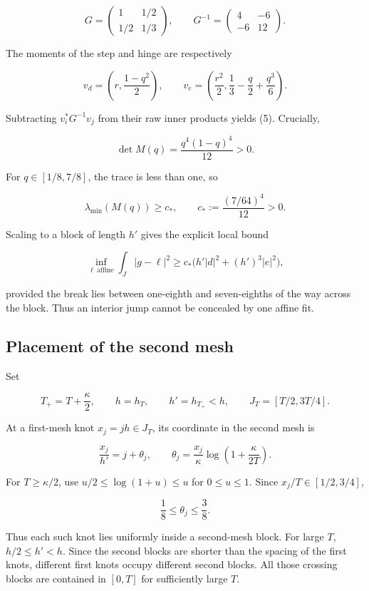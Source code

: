\documentclass[
  11pt,
]{article}
\begin{document}
\[
G=\begin{pmatrix}1&1/2\\1/2&1/3\end{pmatrix},
\qquad G^{-1}=\begin{pmatrix}4&-6\\-6&12\end{pmatrix}.
\]

The moments of the step and hinge are respectively

\[
v_d=\left(r,\frac{1-q^2}{2}\right),
\qquad
v_e=\left(\frac{r^2}{2},\frac13-\frac q2+\frac{q^3}{6}\right).
\]

Subtracting \(v_i^*G^{-1}v_j\) from their raw inner products yields (5).
Crucially,

\[
\det M(q)=\frac{q^4(1-q)^4}{12}>0. \tag{6}
\]

For \(q\in[1/8,7/8]\), the trace is less than one, so

\[
\lambda_{\min}(M(q))\ge c_*,
\qquad c_*:=\frac{(7/64)^4}{12}>0. \tag{7}
\]

Scaling to a block of length \(h'\) gives the explicit local bound

\[
\inf_{\ell\ \mathrm{affine}}
\int_{J}|g-\ell|^2
\ge c_*\bigl(h'|d|^2+(h')^3|e|^2\bigr), \tag{8}
\]

provided the break lies between one-eighth and seven-eighths of the way
across the block. Thus an interior jump cannot be concealed by one
affine fit.

\hypertarget{placement-of-the-second-mesh}{%
\subsection{Placement of the second
mesh}\label{placement-of-the-second-mesh}}

Set

\[
T_+=T+\frac\kappa2,\qquad
h=h_T,\qquad h'=h_{T_+}<h,
\qquad J_T=[T/2,3T/4].
\]

At a first-mesh knot \(x_j=jh\in J_T\), its coordinate in the second
mesh is

\[
\frac{x_j}{h'}
=j+\theta_j,
\qquad
\theta_j=\frac{x_j}{\kappa}
\log\left(1+\frac{\kappa}{2T}\right). \tag{9}
\]

For \(T\ge\kappa/2\), use \(u/2\le\log(1+u)\le u\) for \(0\le u\le1\).
Since \(x_j/T\in[1/2,3/4]\),

\[
\frac18\le\theta_j\le\frac38. \tag{10}
\]

Thus each such knot lies uniformly inside a second-mesh block. For large
\(T\), \(h/2\le h'<h\). Since the second blocks are shorter than the
spacing of the first knots, different first knots occupy different
second blocks. All those crossing blocks are contained in \([0,T]\) for
sufficiently large \(T\).
\end{document}
